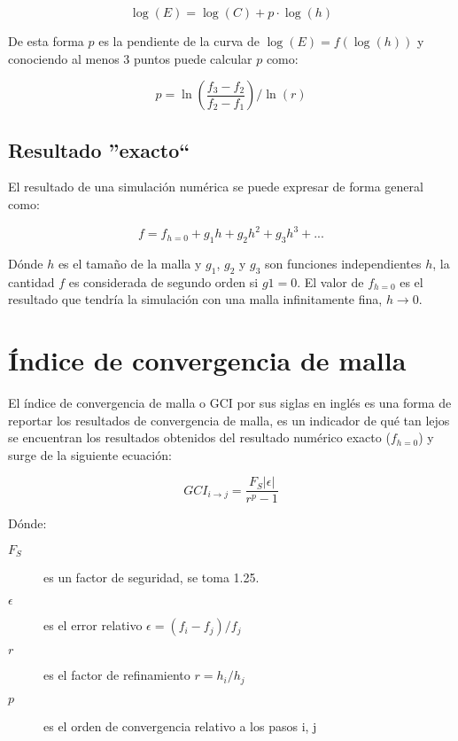 \begin{equation}
    \log(E) = \log(C) + p \cdot \log(h)
\end{equation}

De esta forma $p$ es la pendiente de la curva de $\log(E)=f(\log(h))$ y
conociendo al menos 3 puntos puede calcular $p$ como:

\begin{equation}
p = \ln \left( \frac{ f_3 - f_2 } { f_2 - f_1 } \right) / \ln(r)
\label{eq:ord-conv}
\end{equation}

\subsection{Resultado ''exacto``}
%
El resultado de una simulación numérica se puede expresar de forma general
como:

\begin{equation} \label{eq:expansion}
    f = f_{h=0} + g_1 h + g_2 h^2 + g_3 h^3 + ...
\end{equation}

Dónde $h$ es el tamaño de la malla y $g_1$, $g_2$ y $g_3$ son funciones
independientes $h$, la cantidad $f$ es considerada de segundo orden si $g1 =
0$.
%
El valor de $f_{h=0}$ es el resultado que tendría la simulación con una malla
infinitamente fina, $h \rightarrow 0$.

\section{Índice de convergencia de malla}
%
El índice de convergencia de malla o GCI por sus siglas en inglés es una forma
de reportar los resultados de convergencia de malla, es un indicador de qué tan
lejos se encuentran los resultados obtenidos del resultado numérico exacto
($f_{h=0}$) y surge de la siguiente ecuación:

\begin{equation} \label{eq:gci}
GCI_{i \rightarrow j} = \frac{F_S |\epsilon|}{r^p - 1}
\end{equation}

Dónde:
\begin{description}
    \item[$F_S$] es un factor de seguridad, se toma 1.25.
    \item[$\epsilon$] es el error relativo $\epsilon = (f_i - f_j) / f_j$
    \item[$r$] es el factor de refinamiento $r = h_i/h_j$
    \item[$p$] es el orden de convergencia relativo a los pasos i, j
\end{description}

